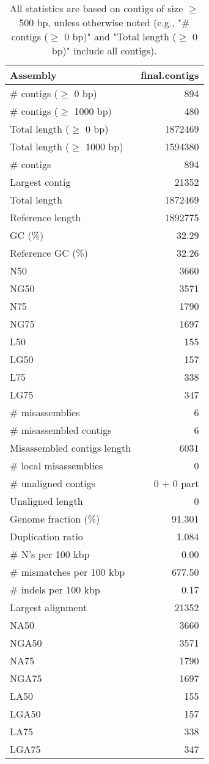\documentclass[12pt,a4paper]{article}
\begin{document}
\begin{table}[ht]
\begin{center}
\caption{All statistics are based on contigs of size $\geq$ 500 bp, unless otherwise noted (e.g., "\# contigs ($\geq$ 0 bp)" and "Total length ($\geq$ 0 bp)" include all contigs).}
\begin{tabular}{|l*{1}{|r}|}
\hline
Assembly & final.contigs \\ \hline
\# contigs ($\geq$ 0 bp) & 894 \\ \hline
\# contigs ($\geq$ 1000 bp) & 480 \\ \hline
Total length ($\geq$ 0 bp) & 1872469 \\ \hline
Total length ($\geq$ 1000 bp) & 1594380 \\ \hline
\# contigs & 894 \\ \hline
Largest contig & 21352 \\ \hline
Total length & 1872469 \\ \hline
Reference length & 1892775 \\ \hline
GC (\%) & 32.29 \\ \hline
Reference GC (\%) & 32.26 \\ \hline
N50 & 3660 \\ \hline
NG50 & 3571 \\ \hline
N75 & 1790 \\ \hline
NG75 & 1697 \\ \hline
L50 & 155 \\ \hline
LG50 & 157 \\ \hline
L75 & 338 \\ \hline
LG75 & 347 \\ \hline
\# misassemblies & 6 \\ \hline
\# misassembled contigs & 6 \\ \hline
Misassembled contigs length & 6031 \\ \hline
\# local misassemblies & 0 \\ \hline
\# unaligned contigs & 0 + 0 part \\ \hline
Unaligned length & 0 \\ \hline
Genome fraction (\%) & 91.301 \\ \hline
Duplication ratio & 1.084 \\ \hline
\# N's per 100 kbp & 0.00 \\ \hline
\# mismatches per 100 kbp & 677.50 \\ \hline
\# indels per 100 kbp & 0.17 \\ \hline
Largest alignment & 21352 \\ \hline
NA50 & 3660 \\ \hline
NGA50 & 3571 \\ \hline
NA75 & 1790 \\ \hline
NGA75 & 1697 \\ \hline
LA50 & 155 \\ \hline
LGA50 & 157 \\ \hline
LA75 & 338 \\ \hline
LGA75 & 347 \\ \hline
\end{tabular}
\end{center}
\end{table}
\end{document}
